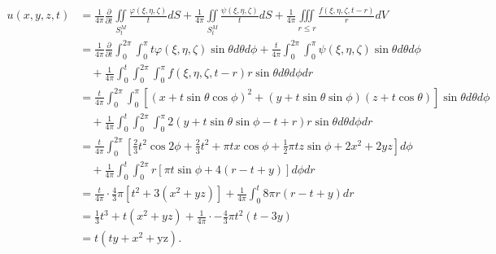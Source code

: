 \documentclass[11pt,a4paper]{article}
\begin{document}
\begin{align*}
  u(x,y,z,t)
   & =\frac{1}{4\pi}\frac{\partial}{\partial t}\iint\limits_{S_{t}^M}\frac{\varphi(\xi,\eta,\zeta)}{t}dS+\frac{1}{4\pi}\iint\limits_{S_{t}^M}\frac{\psi(\xi,\eta,\zeta)}{t}dS+\frac{1}{4\pi}\iiint\limits_{r\leqslant r}\frac{f(\xi,\eta,\zeta,t-r)}{r}dV \\
   & =\frac{1}{4\pi}\frac{\partial}{\partial t}\int_0^{2\pi}\int_0^\pi t\varphi(\xi,\eta,\zeta)\sin\theta d\theta d\phi+\frac{t}{4\pi}\int_0^{2\pi}\int_0^\pi \psi(\xi,\eta,\zeta)\sin\theta d\theta d\phi                                                \\
   & \quad+\frac{1}{4\pi}\int_0^t\int_0^{2\pi}\int_0^\pi f(\xi,\eta,\zeta,t-r) r\sin\theta d\theta d\phi dr                                                                                                                                               \\
   & =\frac{t}{4\pi}\int_0^{2\pi}\int_0^\pi [(x+t\sin\theta\cos\phi)^2+(y+t\sin\theta\sin\phi)(z+t\cos\theta)]\sin\theta d\theta d\phi                                                                                                                    \\
   & \quad+\frac{1}{4\pi}\int_0^t\int_0^{2\pi}\int_0^\pi 2(y+t\sin\theta\sin\phi-t+r) r\sin\theta d\theta d\phi dr                                                                                                                                        \\
   & =\frac{t}{4\pi}\int_0^{2\pi} \left[\frac{2}{3}  t^2 \cos 2 \phi +\frac{2}{3} t^2+\pi   t x \cos \phi +\frac{1}{2} \pi   t z \sin \phi +2 x^2+2 y z \right]d\phi                                                                                      \\
   & \quad+\frac{1}{4\pi}\int_0^t\int_0^{2\pi} r [\pi   t \sin \phi +4 (r-t+y)]d\phi dr                                                                                                                                                                   \\
   & =\frac{t}{4\pi}\cdot\frac{4}{3} \pi  \left[t^2+3 \left(x^2+y z\right)\right] + \frac{1}{4\pi}\int_0^t 8 \pi  r (r-t+y)dr                                                                                                                             \\
   & =\frac{1}{3} t^3+t \left(x^2+y z\right)+\frac{1}{4\pi}\cdot-\frac{4}{3} \pi  t^2 (t-3 y)                                                                                                                                                             \\
   & =t \left(t y+x^2+\text{yz}\right).
\end{align*}
\end{document}
